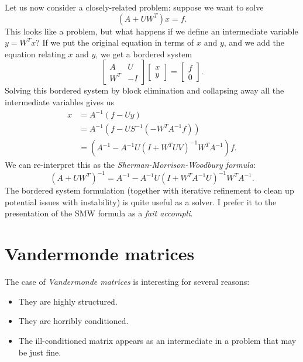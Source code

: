 \documentclass[12pt, leqno]{article} %
\begin{document}
Let us now consider a closely-related problem: suppose we want
to solve
\[
  (A+UW^T) x = f.
\]
This looks like a problem, but what happens if we define an
intermediate variable $y = W^T x$?  If we put the original
equation in terms of $x$ and $y$, and we add the equation
relating $x$ and $y$, we get a bordered system
\[
  \begin{bmatrix} A & U \\ W^T & -I \end{bmatrix}
  \begin{bmatrix} x \\ y \end{bmatrix} =
  \begin{bmatrix} f \\ 0 \end{bmatrix}.
\]
Solving this bordered system by block elimination and
collapsing away all the intermediate variables gives us
\begin{align*}
  x &= A^{-1} \left( f - U y \right) \\
    &= A^{-1} \left( f - U S^{-1} (-W^T A^{-1} f) \right) \\
    &= \left( A^{-1} - A^{-1} U (I+W^T U V)^{-1} W^T A^{-1} \right) f.
\end{align*}
We can re-interpret this as the {\em Sherman-Morrison-Woodbury formula}:
\[
  (A+UW^T)^{-1} = A^{-1} - A^{-1} U (I+W^T A^{-1} U)^{-1} W^T A^{-1}.
\]
The bordered system formulation (together with iterative refinement
to clean up potential issues with instability) is quite useful as a
solver.  I prefer it to the presentation of the SMW formula as a
{\em fait accompli}.

\section{Vandermonde matrices}

The case of {\em Vandermonde matrices} is interesting for several
reasons:
\begin{itemize}
  \item They are highly structured.
  \item They are horribly conditioned.
  \item The ill-conditioned matrix appears as an intermediate
    in a problem that may be just fine.
\end{itemize}
\end{document}
